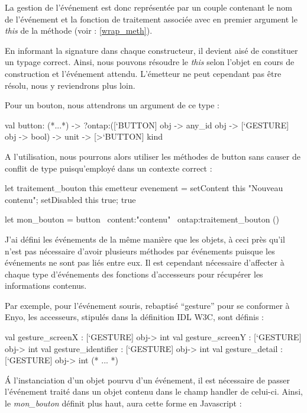 \documentclass[11pt,a4paper]{report}
\begin{document}
La gestion de l'événement est donc représentée par un couple contenant le nom de l'événement et la 
fonction de traitement associée avec en premier argument le \emph{this} de la méthode (voir : \ref{wrap_meth}).

En informant la signature dans chaque constructeur, il devient aisé de constituer un typage correct.
Ainsi, nous pouvons résoudre le \emph{this} selon l'objet en cours de construction et l'événement attendu.
L'émetteur ne peut cependant pas être résolu, nous y reviendrons plus loin.

Pour un bouton, nous attendrons un argument de ce type :

\begin{OCaml}
  val button:
    (*...*)
    -> ?ontap:([`BUTTON] obj -> any_id obj -> [`GESTURE] obj -> bool)
    -> unit -> [>`BUTTON] kind
\end{OCaml}

A l'utilisation, nous pourrons alors utiliser les méthodes de button sans causer de conflit de type 
puisqu'employé dans un contexte correct :

\begin{OCaml}
let traitement_bouton this emetteur evenement = 
   setContent this "Nouveau contenu";
   setDisabled this true;
   true

let mon_bouton = button ~content:"contenu" ~ontap:traitement_bouton ()
\end{OCaml}

J'ai défini les événements de la même manière que les objets, à ceci près qu'il n'est pas nécessaire 
d'avoir plusieurs méthodes par événements puisque les événements ne sont pas liés entre eux. Il 
est cependant nécessaire d'affecter à chaque type d'événements des fonctions d'accesseurs pour 
récupérer les informations contenus.

Par exemple, pour l'événement souris, rebaptisé ``gesture'' pour se conformer à Enyo, les accesseurs,
stipulés dans la définition IDL W3C, sont définis :

\begin{OCaml}
  val gesture_screenX : [`GESTURE] obj-> int
  val gesture_screenY : [`GESTURE] obj-> int
  val gesture_identifier : [`GESTURE] obj-> int
  val gesture_detail : [`GESTURE] obj-> int
  (* ... *)
\end{OCaml}
\medskip

\'A l'instanciation d'un objet pourvu d'un événement, il est nécessaire de passer l'événement traité
dans un objet contenu dans le champ handler de celui-ci. Ainsi, le \emph{mon\_bouton} définit plus haut,
aura cette forme en Javascript :
\end{document}
